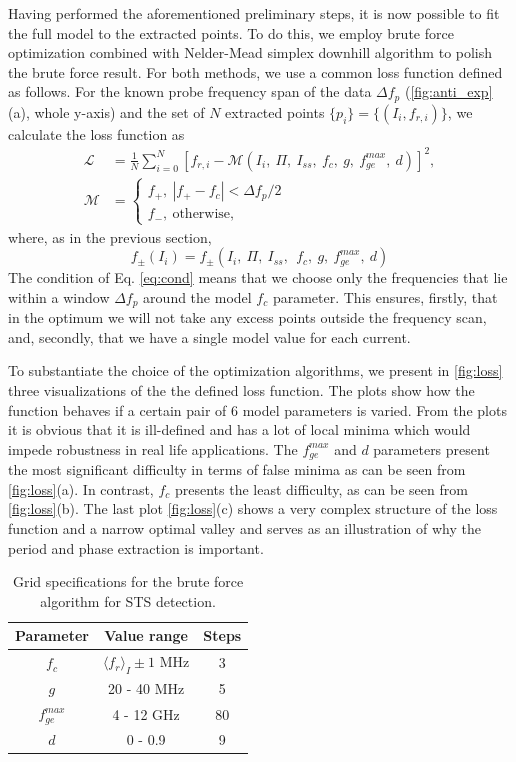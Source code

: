 \documentclass[%
 aip,
 amsmath,amssymb,
 reprint,%
]{revtex4-1}
\begin{document}
 
Having performed the aforementioned preliminary steps, it is now possible to fit the full model to the extracted points. To do this, we employ brute force optimization combined with Nelder-Mead simplex downhill algorithm\cite{nelder1965} to polish the brute force result. For both methods, we use a common loss function defined as follows. For the known probe frequency span of the data $\Delta f_p$ (\autoref{fig:anti_exp}(a), whole y-axis) and the set of $N$ extracted points $\{p_i\} = \{(I_i, f_{r,i})\}$, we calculate the loss function as
\begin{align}
\mathcal{L} &= \frac{1}{N}\sum_{i=0}^N [f_{r,i} - \mathcal{M}(I_i,\ \Pi, \ I_{ss},\ f_c,\ g,\ f_{ge}^{max},\ d)]^2,\label{eq:loss}\\
\mathcal{M} &= \begin{cases}
f_+,\  |f_+ - f_c|< \Delta f_p/2 \\
f_-,\ \text{otherwise}, \label{eq:cond}
\end{cases}
\end{align}
where, as in the previous section, $$f_{\pm}(I_i) = f_{\pm}(I_i,\ \Pi,\ I_{ss},\ \ f_c,\ g,\ f_{ge}^{max},\ d)$$
The condition of Eq. \eqref{eq:cond} means that we choose only the frequencies that lie within a window $\Delta f_p$ around the model $f_c$ parameter. This ensures, firstly, that in the optimum we will not take any excess points outside the frequency scan, and, secondly, that we have a single model value for each current.

To substantiate the choice of the optimization algorithms, we present in \autoref{fig:loss} three visualizations of the the defined loss function. The plots show how the function behaves if a certain pair of 6 model parameters is varied. From the plots it is obvious that it is ill-defined and has a lot of local minima which would impede robustness in real life applications. The $f^{max}_{ge}$ and $d$ parameters present the most significant difficulty in terms of false minima as can be seen from \autoref{fig:loss}(a). In contrast, $f_c$ presents the least difficulty, as can be seen from \autoref{fig:loss}(b). The last plot \autoref{fig:loss}(c) shows a very complex structure of the loss function and a narrow optimal valley and serves as an illustration of why the period and phase extraction is important.

\begin{table}
	\centering
	\begin{ruledtabular}
		\begin{tabular}{ccc} 
			Parameter & Value range & Steps \\ 
			\hline
			$f_c$ & $\langle f_r \rangle_{I} \pm 1$ MHz & 3\\ 
			$g$ & 20 - 40 MHz & 5\\
			$f_{ge}^{max}$ &  4 - 12 GHz & 80 \\
			$d$& 0 - 0.9 & 9
		\end{tabular} 
	\end{ruledtabular}
	\caption{Grid specifications for the brute force algorithm for STS detection.}
	\label{tab:grid}
\end{table}
\end{document}
